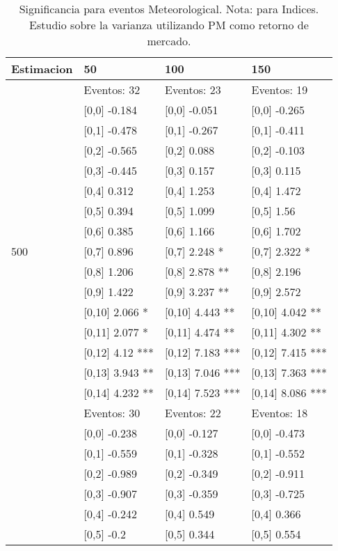 \begin{table}

\caption{Significancia para eventos Meteorological. Nota: para Indices. Estudio sobre la varianza utilizando PM como retorno de mercado.}
\centering
\begin{tabular}[t]{llll}
\toprule
Estimacion & 50 & 100 & 150\\
\midrule
 & Eventos:  32 & Eventos:  23 & Eventos:  19\\
 & {}[0,0] -0.184 & {}[0,0] -0.051 & {}[0,0] -0.265\\
 & {}[0,1] -0.478 & {}[0,1] -0.267 & {}[0,1] -0.411\\
 & {}[0,2] -0.565 & {}[0,2] 0.088 & {}[0,2] -0.103\\
 & {}[0,3] -0.445 & {}[0,3] 0.157 & {}[0,3] 0.115\\
\addlinespace
 & {}[0,4] 0.312 & {}[0,4] 1.253 & {}[0,4] 1.472\\
 & {}[0,5] 0.394 & {}[0,5] 1.099 & {}[0,5] 1.56\\
 & {}[0,6] 0.385 & {}[0,6] 1.166 & {}[0,6] 1.702\\
500 & {}[0,7] 0.896 & {}[0,7] 2.248 * & {}[0,7] 2.322 *\\
 & {}[0,8] 1.206 & {}[0,8] 2.878 ** & {}[0,8] 2.196\\
\addlinespace
 & {}[0,9] 1.422 & {}[0,9] 3.237 ** & {}[0,9] 2.572\\
 & {}[0,10] 2.066 * & {}[0,10] 4.443 ** & {}[0,10] 4.042 **\\
 & {}[0,11] 2.077 * & {}[0,11] 4.474 ** & {}[0,11] 4.302 **\\
 & {}[0,12] 4.12 *** & {}[0,12] 7.183 *** & {}[0,12] 7.415 ***\\
 & {}[0,13] 3.943 ** & {}[0,13] 7.046 *** & {}[0,13] 7.363 ***\\
\addlinespace
 & {}[0,14] 4.232 ** & {}[0,14] 7.523 *** & {}[0,14] 8.086 ***\\
 & Eventos:  30 & Eventos:  22 & Eventos:  18\\
 & {}[0,0] -0.238 & {}[0,0] -0.127 & {}[0,0] -0.473\\
 & {}[0,1] -0.559 & {}[0,1] -0.328 & {}[0,1] -0.552\\
 & {}[0,2] -0.989 & {}[0,2] -0.349 & {}[0,2] -0.911\\
\addlinespace
 & {}[0,3] -0.907 & {}[0,3] -0.359 & {}[0,3] -0.725\\
 & {}[0,4] -0.242 & {}[0,4] 0.549 & {}[0,4] 0.366\\
 & {}[0,5] -0.2 & {}[0,5] 0.344 & {}[0,5] 0.554\\

\end{tabular}
\end{table}
